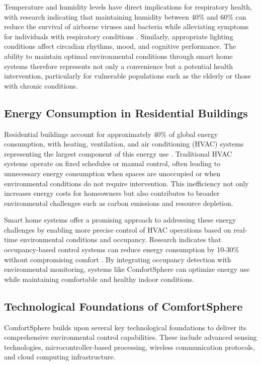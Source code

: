 \documentclass[a4paper]{scrartcl}
\begin{document}
    Temperature and humidity levels have direct implications for respiratory health, with research indicating that maintaining humidity between 40\% and 60\% can reduce the survival of airborne viruses and bacteria while alleviating symptoms for individuals with respiratory conditions \cite{paper29}. Similarly, appropriate lighting conditions affect circadian rhythms, mood, and cognitive performance. The ability to maintain optimal environmental conditions through smart home systems therefore represents not only a convenience but a potential health intervention, particularly for vulnerable populations such as the elderly or those with chronic conditions.
    
    \subsection{Energy Consumption in Residential Buildings}
    Residential buildings account for approximately 40\% of global energy consumption, with heating, ventilation, and air conditioning (HVAC) systems representing the largest component of this energy use \cite{paper30}. Traditional HVAC systems operate on fixed schedules or manual control, often leading to unnecessary energy consumption when spaces are unoccupied or when environmental conditions do not require intervention. This inefficiency not only increases energy costs for homeowners but also contributes to broader environmental challenges such as carbon emissions and resource depletion.
    
    Smart home systems offer a promising approach to addressing these energy challenges by enabling more precise control of HVAC operations based on real-time environmental conditions and occupancy. Research indicates that occupancy-based control systems can reduce energy consumption by 10-30\% without compromising comfort \cite{paper13}. By integrating occupancy detection with environmental monitoring, systems like ComfortSphere can optimize energy use while maintaining comfortable and healthy indoor conditions.
    
    \subsection{Technological Foundations of ComfortSphere}
    ComfortSphere builds upon several key technological foundations to deliver its comprehensive environmental control capabilities. These include advanced sensing technologies, microcontroller-based processing, wireless communication protocols, and cloud computing infrastructure.
    
\end{document}
